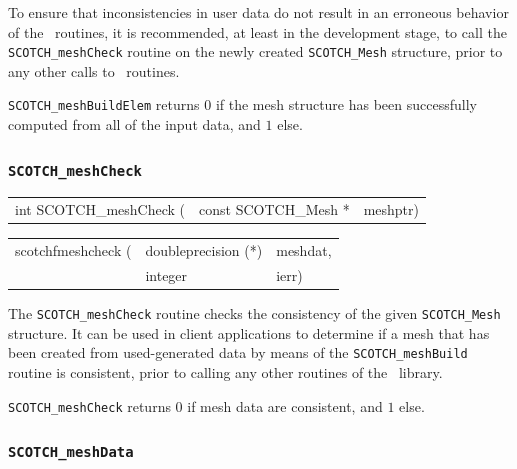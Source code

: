 \begin{itemize}
To ensure that inconsistencies in user data do not result in an
erroneous behavior of the \libscotch\ routines, it is recommended, at
least in the development stage, to call the
\texttt{SCOTCH\_\lbt mesh\lbt Check} routine on the newly created
\texttt{SCOTCH\_\lbt Mesh} structure, prior to any other calls to
\libscotch\ routines.

\progret

\texttt{SCOTCH\_meshBuildElem} returns $0$ if the mesh structure has
been successfully computed from all of the input data, and $1$ else.
\end{itemize}

\subsubsection{{\tt SCOTCH\_meshCheck}}

\begin{itemize}
\progsyn

{\tt\begin{tabular}{l@{}ll}
int SCOTCH\_meshCheck ( & const SCOTCH\_Mesh * & meshptr)
\end{tabular}}

{\tt\begin{tabular}{l@{}ll}
scotchfmeshcheck ( & doubleprecision (*) & meshdat, \\
                   & integer             & ierr)
\end{tabular}}

\progdes

The {\tt SCOTCH\_meshCheck} routine checks the consistency of the
given {\tt SCOTCH\_\lbt Mesh} structure. It can be used in client
applications to determine if a mesh that has been created from
used-generated data by means of the {\tt SCOTCH\_\lbt mesh\lbt Build}
routine is consistent, prior to calling any other routines of the
\libscotch\ library.

\progret

{\tt SCOTCH\_meshCheck} returns $0$ if mesh data are consistent, and
$1$ else.

\end{itemize}

\subsubsection{{\tt SCOTCH\_meshData}}
\label{sec-lib-func-meshdata}

